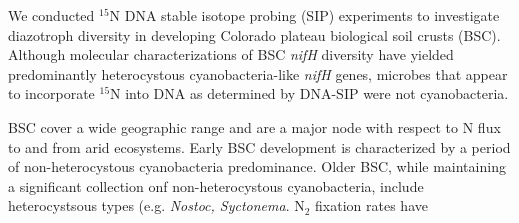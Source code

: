 We conducted $^{15}$N DNA stable isotope probing (SIP) experiments to investigate diazotroph diversity in developing Colorado plateau biological soil crusts (BSC). Although molecular characterizations of BSC \textit{nifH} diversity have yielded predominantly heterocystous cyanobacteria-like \textit{nifH} genes, microbes that appear to incorporate $^{15}$N into DNA as determined by DNA-SIP were not cyanobacteria.

BSC cover a wide geographic range and are a major node with respect to N flux to and from arid ecosystems. Early BSC development is characterized by a period of non-heterocystous cyanobacteria predominance. Older BSC, while maintaining a significant collection onf non-heterocystous cyanobacteria, include heterocystsous types (e.g. \textit{Nostoc, Syctonema}. N$_{2}$ fixation rates have    


